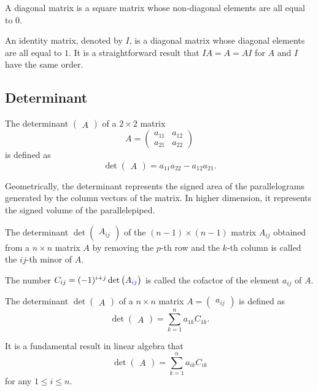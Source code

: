 A diagonal matrix is a square matrix whose non-diagonal elements are all equal to $0$.

An identity matrix, denoted by $I$, is a diagonal matrix whose diagonal elements are all equal to $1$. It is a straightforward result that $IA=A=AI$ for $A$ and $I$ have the same order.

\subsection*{Determinant}

The determinant $\begin{pmatrix}
  A
\end{pmatrix}$ of a $2\times 2$ matrix
\[A=\begin{pmatrix}
  a_{11} & a_{12}\\
  a_{21} & a_{22}
\end{pmatrix}\]
is defined as
\[
  \det\begin{pmatrix}
  A
\end{pmatrix}=a_{11}a_{22}-a_{12}a_{21}.\]

Geometrically, the determinant represents the signed area of the parallelograms generated by the column vectors of the matrix. In higher dimension, it represents the signed volume of the parallelepiped.

The determinant $\det\begin{pmatrix} A_{ij} \end{pmatrix}$ of the $(n-1)\times (n-1)$ matrix $A_{ij}$ obtained from a $n\times n$ matrix $A$ by removing the $p$-th row and the $k$-th column is called the $ij$-th minor of $A$.

The number $C_{ij}=(-1)^{i+j}\det\begin{pmatrix}A_{\color{blue}{ij}}\end{pmatrix}$ is called the cofactor of the element $a_{ij}$ of $A$.

The determinant $\det\begin{pmatrix}
  A
\end{pmatrix}$ of a $n\times n$ matrix $A=\begin{pmatrix}
  a_{ij}
\end{pmatrix}$ is defined as
\[\det\begin{pmatrix}
  A
\end{pmatrix}=\sum\limits_{k=1}^n a_{1k}C_{1k}.\]

It is a fundamental result in linear algebra that 
\[\det\begin{pmatrix}
  A
\end{pmatrix}=\sum\limits_{k=1}^n a_{ik}C_{ik}\]
for any $1\le i\le n$.

